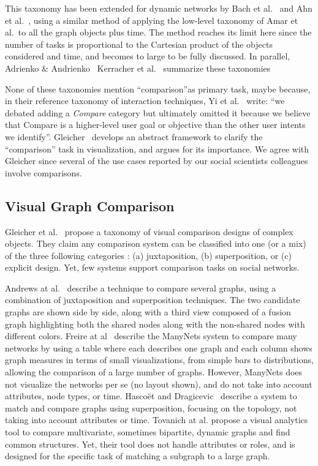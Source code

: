 This taxonomy has been extended for dynamic networks by Bach et al.~\cite{bach:hal-00906597} and Ahn et al.~\cite{Ahn14}, using a similar method of applying the low-level taxonomy of Amar et al.\ to all the graph objects plus time. The method reaches its limit here since the number of tasks is proportional to the Cartesian product of the objects considered and time, and becomes to large to be fully discussed.
In parallel, Adrienko \& Andrienko~\cite{andrienko2006exploratory}
Kerracher et al.~\cite{Kerracher15} summarize these taxonomies 

None of these taxonomies mention ``comparison''as primary task, maybe because, in their reference taxonomy of interaction techniques, Yi et al.~\cite{Yi07} write: ``we debated adding a \emph{Compare} category but ultimately
omitted it because we believe that Compare is a higher-level user goal or objective than the other user intents we identify''. Gleicher~\cite{Gleicher18, gleicher_visual_2011} develops an abstract framework to clarify the ``comparison'' task in visualization, and argues for its importance. We agree with Gleicher since several of the use cases reported by our social scientists colleagues involve comparisons.
\fi
\subsection{Visual Graph Comparison}

Gleicher et al.~\cite{gleicher_visual_2011} propose a taxonomy of visual comparison designs of complex objects. They claim any comparison system can be classified into one (or a mix) of the three following categories : (a) juxtaposition, (b) superposition, or (c) explicit design.
Yet, few systems support comparison tasks on social networks.

Andrews at al.~\cite{andrews_visual_2009} describe a technique to compare several graphs, using a combination of juxtaposition and superposition techniques. The two candidate graphs are shown side by side, along with a third view composed of a fusion graph highlighting both the shared nodes along with the non-shared nodes with different colors.
%
Freire at al~\cite{ManyNets} describe the ManyNets system to compare many networks by using a table where each describes one graph and each column shows graph measures in terms of small visualizations, from simple bars to distributions, allowing the comparison of a large number of graphs. However, ManyNets does not visualize the networks per se (no layout shown), and do not take into account attributes, node types, or time.
%
Hascoët and Dragicevic~\cite{HascoetD12} describe a system to match and compare graphs using superposition, focusing on the topology, not taking into account attributes or time.
Tovanich at al.\cite{tovanich_vast_2021} propose a visual analytics tool to compare multivariate, sometimes bipartite, dynamic graphs and find common structures. Yet, their tool does not handle attributes or roles, and is designed for the specific task of matching a subgraph to a large graph.





